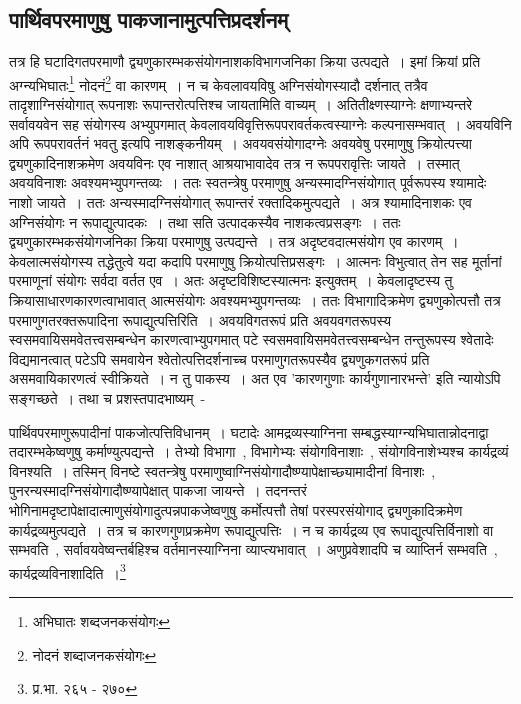 		\subsection{पार्थिवपरमाणुषु पाकजानामुत्पत्तिप्रदर्शनम्}

		तत्र हि घटादिगतपरमाणौ द्व्यणुकारम्भकसंयोगनाशकविभागजनिका क्रिया उत्पद्यते~। इमां क्रियां प्रति अग्न्यभिघातः\footnote{अभिघातः शब्दजनकसंयोगः} नोदनं\footnote{नोदनं शब्दाजनकसंयोगः} वा कारणम्~। न च केवलावयविषु अग्निसंयोगस्यादौ दर्शनात् तत्रैव तादृशाग्निसंयोगात् रूपनाशः रूपान्तरोत्पत्तिश्च जायतामिति वाच्यम्~। अतितीक्ष्णस्याग्नेः क्षणाभ्यन्तरे सर्वावयवेन सह संयोगस्य अभ्युपगमात् केवलावयविवृत्तिरूपपरावर्तकत्वस्याग्नेः कल्पनासम्भवात्~। अवयविनि अपि रूपपरावर्तनं भवतु इत्यपि नाशङ्कनीयम्~। अवयवसंयोगादग्नेः अवयवेषु परमाणुषु क्रियोत्पत्त्या द्व्यणुकादिनाशक्रमेण अवयविनः एव नाशात् आश्रयाभावादेव तत्र न रूपपरावृत्तिः जायते~। तस्मात् अवयविनाशः अवश्यमभ्युपगन्तव्यः~। ततः स्वतन्त्रेषु परमाणुषु अन्यस्मादग्निसंयोगात् पूर्वरूपस्य श्यामादेः नाशो जायते~। ततः अन्यस्मादग्निसंयोगात् रूपान्तरं रक्तादिकमुत्पद्यते~। अत्र श्यामादिनाशकः एव अग्निसंयोगः न रूपाद्युत्पादकः‌~। तथा सति उत्पादकस्यैव नाशकत्वप्रसङ्गः~। ततः द्व्यणुकारम्भकसंयोगजनिका क्रिया परमाणुषु उत्पद्यन्ते~। तत्र अदृष्टवदात्मसंयोग एव कारणम्~। केवलात्मसंयोगस्य तद्धेतुत्वे यदा कदापि परमाणुषु क्रियोत्पत्तिप्रसङ्गः~। आत्मनः विभुत्वात् तेन सह मूर्तानां परमाणूनां संयोगः सर्वदा वर्तत एव~। अतः अदृष्टविशिष्टस्यात्मनः इत्युक्तम्~। केवलादृष्टस्य तु क्रियासाधारणकारणत्वाभावात् आत्मसंयोगः अवश्यमभ्युपगन्तव्यः~। ततः विभागादिक्रमेण द्व्यणुकोत्पत्तौ तत्र परमाणुगतरक्तरूपादिना रूपाद्युत्पत्तिरिति~। अवयविगतरूपं प्रति अवयवगतरूपस्य स्वसमवायिसमवेतत्त्वसम्बन्धेन कारणत्वाभ्युपगमात् पटे स्वसमवायिसमवेतत्त्वसम्बन्धेन तन्तुरूपस्य श्वेतादेः विद्यमानत्वात् पटेऽपि समवायेन श्वेतोत्पत्तिदर्शनाच्च परमाणुगतरूपस्यैव द्व्यणुकगतरूपं प्रति असमवायिकारणत्वं स्वीक्रियते~। न तु पाकस्य~। अत एव 'कारणगुणाः कार्यगुणानारभन्ते' इति न्यायोऽपि सङ्गच्छते~। तथा च प्रशस्तपादभाष्यम्~-

		{\fontsize{11.7}{0}\selectfont\s पार्थिवपरमाणुरूपादीनां पाकजोत्पत्तिविधानम्~। घटादेः आमद्रव्यस्याग्निना सम्बद्धस्याग्न्यभिघातान्नोदनाद्वा तदारम्भकेष्वणुषु कर्माण्युत्पद्यन्ते~। तेभ्यो विभागा~, विभागेभ्यः संयोगविनाशाः~, संयोगविनाशेभ्यश्च कार्यद्रव्यं विनश्यति~। तस्मिन् विनष्टे स्वतन्त्रेषु परमाणुष्वाग्निसंयोगादौष्ण्यापेक्षाच्छ्यामादीनां विनाशः~, पुनरन्यस्मादग्निसंयोगादौष्ण्यापेक्षात् पाकजा जायन्ते~। तदनन्तरं भोगिनामदृष्टापेक्षादात्माणुसंयोगादुत्पन्नपाकजेष्वणुषु कर्मोत्पत्तौ तेषां परस्परसंयोगाद् द्व्यणुकादिक्रमेण कार्यद्रव्यमुत्पद्यते~। तत्र च कारणगुणप्रक्रमेण रूपाद्युत्पत्तिः~।  न च कार्यद्रव्य एव रूपाद्युत्पत्तिर्विनाशो वा सम्भवति~, सर्वावयवेष्वन्तर्बहिश्च वर्तमानस्याग्निना व्याप्त्यभावात्~। अणुप्रवेशादपि च व्याप्तिर्न सम्भवति~, कार्यद्रव्यविनाशादिति~।\footnote{प्र.भा. २६५ - २७०}}

